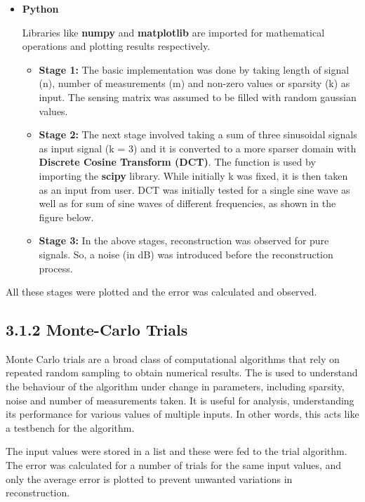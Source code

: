 \documentclass[
  letterpaper,
  DIV=11,
  numbers=noendperiod]{scrartcl}
\begin{document}
\begin{itemize}
\item
  \textbf{Python}

  Libraries like \textbf{numpy} and \textbf{matplotlib} are imported for
  mathematical operations and plotting results respectively.

  \begin{itemize}
  \item
    \textbf{Stage 1:} The basic implementation was done by taking length
    of signal (n), number of measurements (m) and non-zero values or
    sparsity (k) as input. The sensing matrix was assumed to be filled
    with random gaussian values.
  \item
    \textbf{Stage 2:} The next stage involved taking a sum of three
    sinusoidal signals as input signal (k = 3) and it is converted to a
    more sparser domain with \textbf{Discrete Cosine Transform (DCT)}.
    The function is used by importing the \textbf{scipy} library. While
    initially k was fixed, it is then taken as an input from user. DCT
    was initially tested for a single sine wave as well as for sum of
    sine waves of different frequencies, as shown in the figure below.
  \item
    \textbf{Stage 3:} In the above stages, reconstruction was observed
    for pure signals. So, a noise (in dB) was introduced before the
    reconstruction process.
  \end{itemize}
\end{itemize}

All these stages were plotted and the error was calculated and observed.

\subsection{3.1.2 Monte-Carlo Trials}\label{monte-carlo-trials}

Monte Carlo trials are a broad class of computational algorithms that
rely on repeated random sampling to obtain numerical results. The is
used to understand the behaviour of the algorithm under change in
parameters, including sparsity, noise and number of measurements taken.
It is useful for analysis, understanding its performance for various
values of multiple inputs. In other words, this acts like a testbench
for the algorithm.

The input values were stored in a list and these were fed to the trial
algorithm. The error was calculated for a number of trials for the same
input values, and only the average error is plotted to prevent unwanted
variations in reconstruction.
\end{document}
